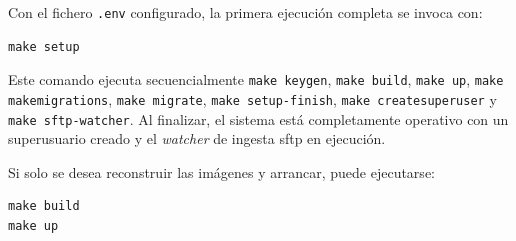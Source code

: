 Con el fichero \texttt{.env} configurado, la primera ejecución completa
se invoca con:

\begin{verbatim}
make setup
\end{verbatim}

Este comando ejecuta secuencialmente \texttt{make keygen},
\texttt{make build}, \texttt{make up}, \texttt{make makemigrations},
\texttt{make migrate}, \texttt{make setup-finish},
\texttt{make createsuperuser} y \texttt{make sftp-watcher}. Al
finalizar, el sistema está completamente operativo con un superusuario
creado y el \textit{watcher} de ingesta \acs{sftp} en ejecución.

Si solo se desea reconstruir las imágenes y arrancar, puede ejecutarse:

\begin{verbatim}
make build
make up
\end{verbatim}
